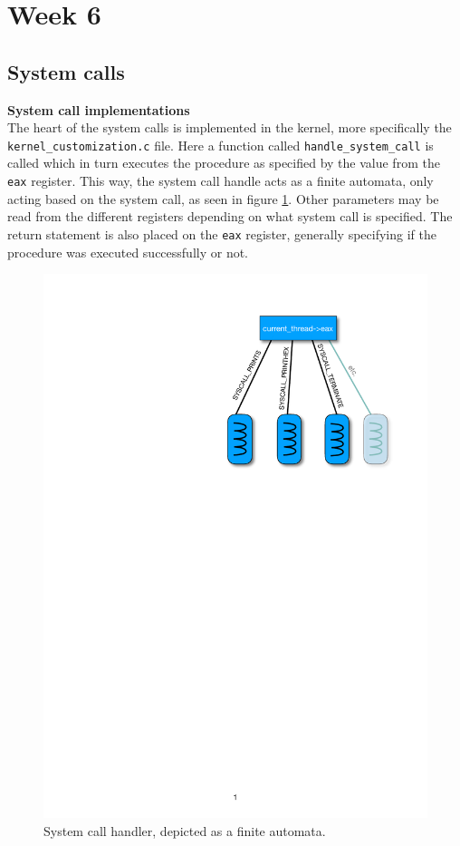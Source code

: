 \section{Week 6}

\subsection{System calls}

    

    

\textbf{System call implementations} \\
The heart of the system calls is implemented in the kernel, more specifically the \texttt{kernel\_customization.c} file. Here a function called \texttt{handle\_system\_call} is called which in turn executes the procedure as specified by the value from the \texttt{eax} register. This way, the system call handle acts as a finite automata, only acting based on the system call, as seen in figure \ref{fig:syscall_imp}. Other parameters may be read from the different registers depending on what system call is specified. The return statement is also placed on the \texttt{eax} register, generally specifying if the procedure was executed successfully or not.

\begin{figure}[H]
    \centering
    \includegraphics[width=0.7\linewidth]{fig/systemcall_implementation.pdf}
    \caption{System call handler, depicted as a finite automata.}
    \label{fig:syscall_imp}
\end{figure}

